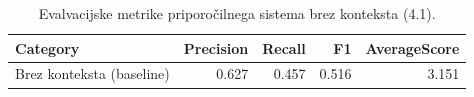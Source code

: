 \begin{table}[h]
\centering
\caption{Evalvacijske metrike priporočilnega sistema brez konteksta (4.1).}
\label{tab:evaluation_metrics_4_1}
\begin{tabular}{lrrrr}
\toprule
Category & Precision & Recall & F1 & AverageScore \\
\midrule
Brez konteksta (baseline) & 0.627 & 0.457 & 0.516 & 3.151 \\
\bottomrule
\end{tabular}

\end{table}
